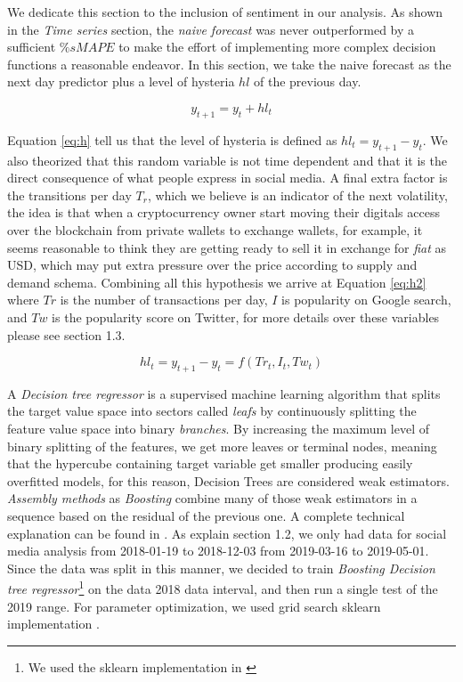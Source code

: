 We dedicate this section to the inclusion of sentiment in our analysis. As shown in the \emph{Time series} section, the \emph{naive forecast} was never outperformed by a sufficient  $\% sMAPE$  to make the effort of implementing more complex decision functions a reasonable endeavor. In this section, we take the naive forecast as the next day predictor plus a level of hysteria  $hl$ of the previous day.

\begin{equation}
y_{t+1}=y_{t}+ hl_{t}
\label{eq:h}
\end{equation}

Equation \ref{eq:h} tell us that the level of hysteria is defined as $hl_{t}=y_{t+1}-y_{t}$. We also theorized that this random variable is not time dependent and that it is the direct consequence of what people express in social media. A final extra factor is the transitions per day $T_{r}$, which we believe is an indicator of the next volatility, the idea is that when a cryptocurrency owner start moving their digitals access over the blockchain from private wallets to exchange wallets, for example, it seems reasonable to think they are getting ready to sell it in exchange for \emph{fiat} as USD, which may put extra pressure over the price according to supply and demand schema. Combining all this hypothesis we arrive at Equation \ref{eq:h2} where $Tr$ is the number of transactions per day, $I$ is popularity on Google search, and $Tw$ is the popularity score on Twitter, for more details over these variables please see section 1.3.

\begin{equation}
hl_{t}=y_{t+1}-y_{t}=f(Tr_{t},I_{t},Tw_{t})
\label{eq:h2}
\end{equation}



A \emph{Decision tree regressor} is a supervised machine learning algorithm that splits the target value space into sectors called \emph{leafs} by continuously splitting the feature value space into binary \emph{branches}. By increasing the maximum level of binary splitting of the features, we get more leaves or terminal nodes, meaning that the hypercube containing target variable get smaller producing easily overfitted models, for this reason, Decision Trees are considered weak estimators. \emph{Assembly methods} as \emph{Boosting} combine many of those weak estimators in a sequence based on the residual of the previous one. A complete technical explanation can be found in \cite{james2013introduction}. As explain section 1.2, we only had data for social media analysis from 2018-01-19 to 2018-12-03 from 2019-03-16 to 2019-05-01. Since the data was split in this manner, we decided to train \emph{Boosting Decision tree regressor}\footnote{ We used the sklearn implementation in \cite{scikitlearn_bo} } on the data 2018 data interval, and then run a single test of the 2019 range. For parameter optimization, we used grid search sklearn implementation \cite{scikitlearn_grid}.\\

